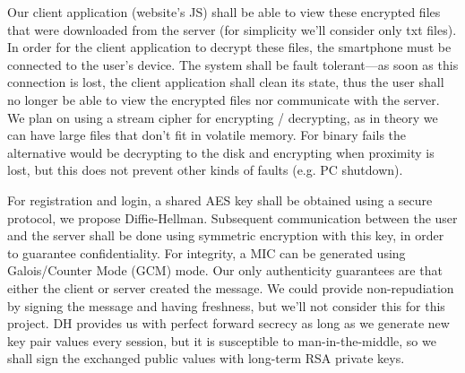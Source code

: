\documentclass[12pt]{article}
\begin{document}
Our client application (website's JS) shall be able to view these encrypted files that were downloaded from the server (for simplicity we'll consider only txt files). In order for the client application to decrypt these files, the smartphone must be connected to the user's device. The system shall be fault tolerant---as soon as this connection is lost, the client application shall clean its state, thus the user shall no longer be able to view the encrypted files nor communicate with the server. We plan on using a stream cipher for encrypting / decrypting, as in theory we can have large files that don't fit in volatile memory. For binary fails the alternative would be decrypting to the disk and encrypting when proximity is lost, but this does not prevent other kinds of faults (e.g. PC shutdown).\par

For registration and login, a shared AES key shall be obtained using a secure protocol, we propose Diffie-Hellman. Subsequent communication between the user and the server shall be done using symmetric encryption with this key, in order to guarantee confidentiality. For integrity, a MIC can be generated using Galois/Counter Mode (GCM) mode. Our only authenticity guarantees are that either the client or server created the message. We could provide non-repudiation by signing the message and having freshness, but we'll not consider this for this project. DH provides us with perfect forward secrecy as long as we generate new key pair values every session, but it is susceptible to man-in-the-middle, so we shall sign the exchanged public values with long-term RSA private keys.\par

\end{document}
